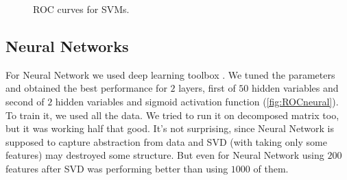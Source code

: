 \documentclass[]{report}
\begin{document}
  \begin{figure}[h]
    \center
    \caption{ROC curves for SVMs.}
  \end{figure}

\subsection{Neural Networks}
For Neural Network we used deep learning toolbox \cite{deep}. We tuned the parameters and obtained the best performance for $2$ layers, first of $50$ hidden variables and second of $2$ hidden variables and sigmoid activation function (\ref{fig:ROCneural}). To train it, we used all the data. We tried to run it on decomposed matrix too, but it was working half that good. It's not surprising, since Neural Network is supposed to capture abstraction from data and SVD (with taking only some features) may destroyed some structure. But even for Neural Network using $200$ features after SVD was performing better than using $1000$ of them.
\end{document}
